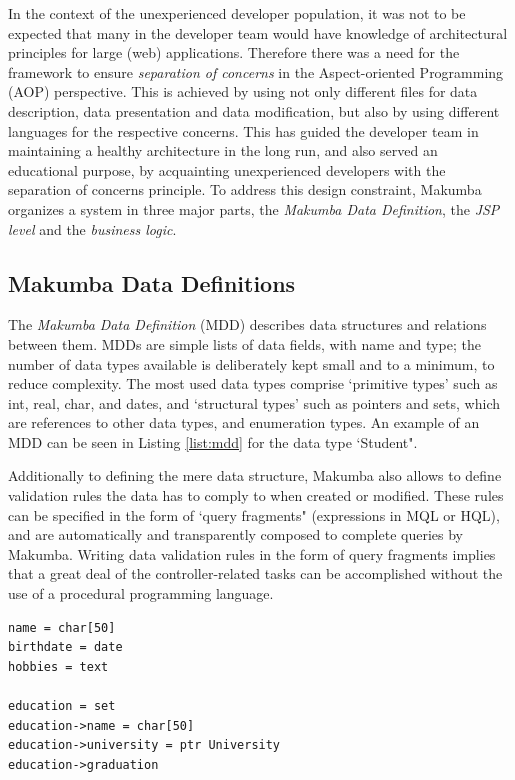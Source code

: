 \documentclass{chi2009}
\begin{document}
In the context of the unexperienced developer population, it was not  to be expected that many in the developer team would have knowledge of architectural principles for large (web) applications. Therefore there was a need for the framework to ensure \textit{separation of concerns}  in the Aspect-oriented Programming (AOP) \cite{Kiczales97aspect-orientedprogramming} perspective. This is achieved by using not only different files for data description, data presentation and data modification, but also by using different languages for the respective concerns. This has guided the developer team in maintaining a healthy architecture in the long run, and also served an educational purpose, by acquainting unexperienced developers with the separation of concerns principle. To address this design constraint, Makumba organizes a system in three major parts, the \textit{Makumba Data Definition}, the \textit{JSP level} and the \textit{business logic}. 

\subsection{Makumba Data Definitions}
The \textit{Makumba Data Definition} (MDD) describes data structures and relations between them. MDDs are simple lists of data fields, with name and type; the number of data types available is deliberately kept small and to a minimum, to reduce complexity. The most used data types comprise `primitive types' such as int, real, char, and dates, and `structural types' such as pointers and sets, which are references to other data types, and enumeration types. An example of an MDD can be seen in Listing \ref{list:mdd} for the data type `Student".

Additionally to defining the mere data structure, Makumba also allows to define validation rules the data has to comply to when created or modified. These rules can be specified in the form of `query fragments" (expressions in MQL or HQL), and are automatically and transparently composed to complete queries by Makumba. Writing data validation rules in the form of query fragments implies that a great deal of the controller-related tasks can be accomplished without the use of a procedural programming language.

\lstset{basicstyle=\small, captionpos=b, caption=Makumba Data Definition "Student", label=list:mdd, frame=shadowbox}
\begin{lstlisting}
name = char[50]
birthdate = date
hobbies = text

education = set
education->name = char[50]
education->university = ptr University
education->graduation
\end{lstlisting}
\end{document}
